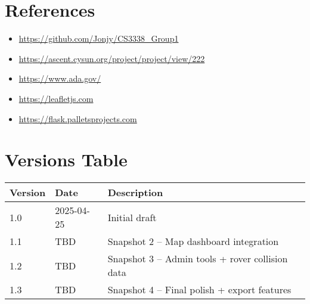 \documentclass[12pt]{article}
\begin{document}
\section{References}
\begin{itemize}
  \item \url{https://github.com/Jonjy/CS3338_Group1}
  \item \url{https://ascent.cysun.org/project/project/view/222}
  \item \url{https://www.ada.gov/}
  \item \url{https://leafletjs.com}
  \item \url{https://flask.palletsprojects.com}
\end{itemize}

\section{Versions Table}
\begin{longtable}{|p{2cm}|p{3cm}|p{10cm}|}
\hline
\textbf{Version} & \textbf{Date} & \textbf{Description} \\
\hline
1.0 & 2025-04-25 & Initial draft \\
\hline
1.1 & TBD & Snapshot 2 – Map dashboard integration \\
\hline
1.2 & TBD & Snapshot 3 – Admin tools + rover collision data \\
\hline
1.3 & TBD & Snapshot 4 – Final polish + export features \\
\hline
\end{longtable}
\end{document}
